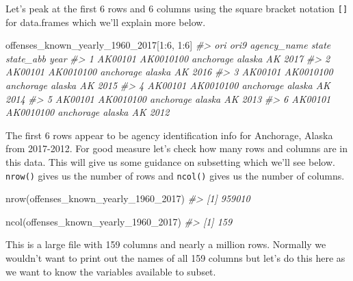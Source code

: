 \documentclass[
  12pt,
  openany]{book}
\newenvironment{Shaded}{\begin{snugshade}}{\end{snugshade}}
\newcommand{\CommentTok}[1]{\textcolor[rgb]{0.37,0.37,0.37}{\textit{#1}}}
\newcommand{\DecValTok}[1]{\textcolor[rgb]{0.06,0.06,0.06}{#1}}
\newcommand{\FunctionTok}[1]{\textcolor[rgb]{0,0,0}{#1}}
\newcommand{\NormalTok}[1]{#1}
\newcommand{\SpecialCharTok}[1]{\textcolor[rgb]{0,0,0}{#1}}
\begin{document}
Let's peak at the first 6 rows and 6 columns using the square bracket notation \texttt{{[}{]}} for data.frames which we'll explain more below.

\begin{Shaded}
\begin{Highlighting}[]
\NormalTok{offenses\_known\_yearly\_1960\_2017[}\DecValTok{1}\SpecialCharTok{:}\DecValTok{6}\NormalTok{, }\DecValTok{1}\SpecialCharTok{:}\DecValTok{6}\NormalTok{]}
\CommentTok{\#\textgreater{}       ori      ori9 agency\_name  state state\_abb year}
\CommentTok{\#\textgreater{} 1 AK00101 AK0010100   anchorage alaska        AK 2017}
\CommentTok{\#\textgreater{} 2 AK00101 AK0010100   anchorage alaska        AK 2016}
\CommentTok{\#\textgreater{} 3 AK00101 AK0010100   anchorage alaska        AK 2015}
\CommentTok{\#\textgreater{} 4 AK00101 AK0010100   anchorage alaska        AK 2014}
\CommentTok{\#\textgreater{} 5 AK00101 AK0010100   anchorage alaska        AK 2013}
\CommentTok{\#\textgreater{} 6 AK00101 AK0010100   anchorage alaska        AK 2012}
\end{Highlighting}
\end{Shaded}

The first 6 rows appear to be agency identification info for Anchorage, Alaska from 2017-2012. For good measure let's check how many rows and columns are in this data. This will give us some guidance on subsetting which we'll see below. \texttt{nrow()} gives us the number of rows and \texttt{ncol()} gives us the number of columns.

\begin{Shaded}
\begin{Highlighting}[]
\FunctionTok{nrow}\NormalTok{(offenses\_known\_yearly\_1960\_2017)}
\CommentTok{\#\textgreater{} [1] 959010}
\end{Highlighting}
\end{Shaded}

\begin{Shaded}
\begin{Highlighting}[]
\FunctionTok{ncol}\NormalTok{(offenses\_known\_yearly\_1960\_2017)}
\CommentTok{\#\textgreater{} [1] 159}
\end{Highlighting}
\end{Shaded}

This is a large file with 159 columns and nearly a million rows. Normally we wouldn't want to print out the names of all 159 columns but let's do this here as we want to know the variables available to subset.
\end{document}
